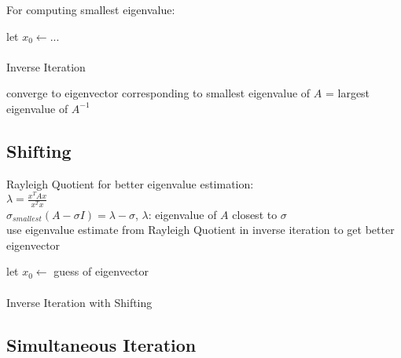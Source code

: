\documentclass[8pt,letter]{article}
\begin{document}
\begin{multicols*}{2}
    For computing smallest eigenvalue:
    
    \begin{algorithm}[H]
      let $x_0 \leftarrow ...$\\
      \\
      \caption{Inverse Iteration \label{Algo_inverse_iteration}}
    \end{algorithm}
    converge to eigenvector corresponding to smallest eigenvalue of $A$ = largest eigenvalue of $A^{-1}$\\

    \vfill\null
    \columnbreak
        
    \subsection{Shifting}
    Rayleigh Quotient for better eigenvalue estimation:\\
    $\lambda = \frac{x^T A x}{x^T x}$\\
    $\sigma_{smallest}(A-\sigma I) = \lambda - \sigma$, $\lambda$: eigenvalue of $A$ closest to $\sigma$\\
    use eigenvalue estimate from Rayleigh Quotient in inverse iteration to get better eigenvector\\
    
    \begin{algorithm}[H]
      let $x_0 \leftarrow$ guess of eigenvector\\
      \\
      \caption{Inverse Iteration with Shifting \label{Algo_inverse_iteration_shifting}}
    \end{algorithm}        
        
    \subsection{Simultaneous Iteration}
    

\end{multicols*}
\end{document}
